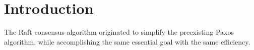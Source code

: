 \section{Introduction}

The Raft consensus algorithm originated to simplify the preexisting Paxos algorithm, while accomplishing the same essential goal \cite{OngaroRaft} with the same efficiency.